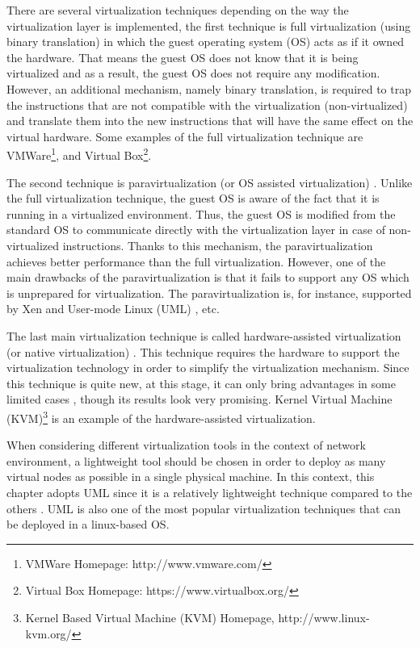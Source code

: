 There are several virtualization techniques depending on the way the virtualization layer is implemented, the first technique is full virtualization (using binary translation) \cite{VMWare_whitepaper} in which the guest operating system (OS) acts as if it owned the hardware. That means the guest OS does not know that it is being virtualized and as a result, the guest OS does not require any modification. However, an additional mechanism, namely binary translation, is required to trap the instructions that are not compatible with the virtualization (non-virtualized) and translate them into the new instructions that will have the same effect on the virtual hardware. Some examples of the full virtualization technique are VMWare\footnote{VMWare Homepage: http://www.vmware.com/}, and Virtual Box\footnote{Virtual Box Homepage: https://www.virtualbox.org/}. 

The second technique is paravirtualization (or OS assisted virtualization) \cite{VMWare_whitepaper}. Unlike the full virtualization technique, the guest OS is aware of the fact that it is running in a virtualized environment. Thus, the guest OS is modified from the standard OS to communicate directly with the virtualization layer in case of non-virtualized instructions. Thanks to this mechanism, the paravirtualization achieves better performance than the full virtualization. However, one of the main drawbacks of the paravirtualization is that it fails to support any OS which is unprepared for virtualization. The paravirtualization is, for instance, supported by Xen \cite{Xen} and User-mode Linux (UML) \cite{UML}, etc. 

The last main virtualization technique is called hardware-assisted virtualization (or native virtualization) \cite{hardwared_assisted}. This technique requires the hardware to support the virtualization technology in order to simplify the virtualization mechanism. Since this technique is quite new, at this stage, it can only bring advantages in some limited cases \cite{VMWare_whitepaper}, though its results look very promising. Kernel Virtual Machine (KVM)\footnote{Kernel Based Virtual Machine (KVM) Homepage, http://www.linux-kvm.org/} is an example of the hardware-assisted virtualization. 

When considering different virtualization tools in the context of network environment, a lightweight tool should be chosen in order to deploy as many virtual nodes as possible in a single physical machine. In this context, this chapter adopts UML since it is a relatively lightweight technique compared to the others \cite{evaluation_UML}. UML is also one of the most popular virtualization techniques that can be deployed in a linux-based OS.

